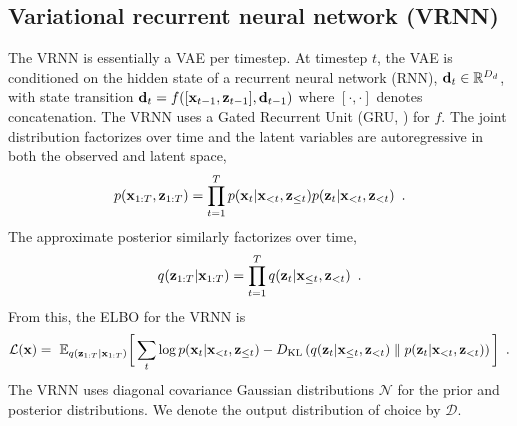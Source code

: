 {\subsection{Variational recurrent neural network ({\small VRNN})}
The VRNN \parencite{chung_recurrent_2015} is essentially a VAE per timestep. At timestep $t$, the VAE is conditioned on the hidden state of a recurrent neural network (RNN), ${\mathbf{d}}_{t}\in\mathbb{R}^{D_d}$, with state transition ${\mathbf{d}}_{t} = f([{\mathbf{x}}_{t-1}, {\mathbf{z}}_{t-1}], {\mathbf{d}}_{t-1})$ where $[\cdot, \cdot]$ denotes concatenation. 
The VRNN uses a Gated Recurrent Unit (GRU, \textcite{cho_properties_2014}) for $f$.
The joint distribution factorizes over time and the latent variables are autoregressive in both the observed and latent space,
\begin{equation}
    p(\xb_{1:T},\zb_{1:T}) = \prod_{t=1}^{T} p(\xb_t|\xb_{<t},\zb_{\leq t}) p(\zb_t|\xb_{<t},\zb_{<t}) \enspace . \label{eq: vrnn joint factorization}
\end{equation}
The approximate posterior similarly factorizes over time,
\begin{equation}
    q(\zb_{1:T}|\xb_{1:T}) = \prod_{t=1}^{T} q(\zb_t|\xb_{\leq t},\zb_{<t}) \enspace . \label{eq: vrnn inference factorization}
\end{equation}
From this, the ELBO for the VRNN is
\begin{equation}
    \mathcal{L}(\xb) = ~ \mathbb{E}_{q(\zb_{1:T}|\xb_{1:T})} \bigg[ \sum_{t} \log p(\xb_t|\xb_{<t},\zb_{\leq t}) - D_\text{KL}\left( q(\zb_t|\xb_{\leq t},\zb_{<t}) \parallel p(\zb_t|\xb_{<t},\zb_{<t}) \right)  \bigg] \label{eq: vrnn elbo} \enspace .
\end{equation}
The VRNN uses diagonal covariance Gaussian distributions $\mathcal{N}$ for the prior and posterior distributions. We denote the output distribution of choice by $\mathcal{D}$. 
}
